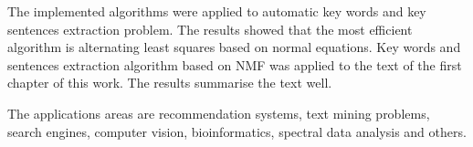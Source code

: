 The implemented algorithms were applied to automatic key words and key sentences extraction problem.
The results showed that the most efficient algorithm is alternating least squares based on normal equations.
Key words and sentences extraction algorithm based on NMF was applied to the text of the first chapter of this work.
The results summarise the text well.

The applications areas are recommendation systems, text mining problems, search engines, computer vision,
bioinformatics, spectral data analysis and others.

\newpage
